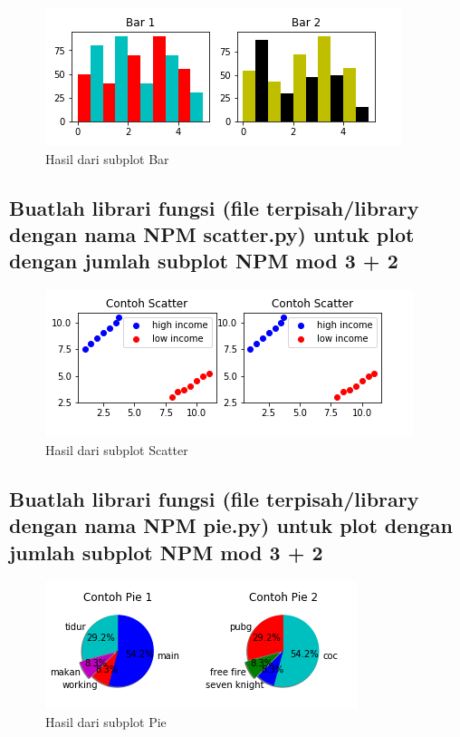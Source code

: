 

\begin{figure}[h]
\centering
\includegraphics[scale=0.9]{figures/6/Praktek/1174002/npm_bar.png}
\caption{Hasil dari subplot Bar}
\label{fig:contoh}
\end{figure}

\subsection{Buatlah librari fungsi (ﬁle terpisah/library dengan nama NPM scatter.py) untuk plot dengan jumlah subplot NPM mod 3 + 2}



\begin{figure}[h]
\centering
\includegraphics[scale=0.9]{figures/6/Praktek/1174002/scatter.png}
\caption{Hasil dari subplot Scatter}
\label{fig:contoh}
\end{figure}

\subsection{Buatlah librari fungsi (ﬁle terpisah/library dengan nama NPM pie.py) untuk plot dengan jumlah subplot NPM mod 3 + 2}



\begin{figure}[h]
\centering
\includegraphics[scale=1.2]{figures/6/Praktek/1174002/pie.png}
\caption{Hasil dari subplot Pie}
\label{fig:contoh}
\end{figure}

